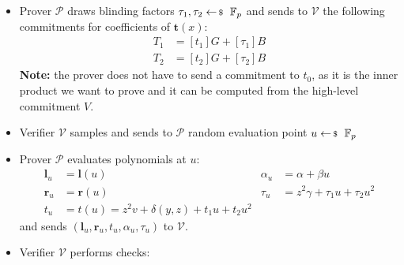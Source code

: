 \documentclass[../../book.tex]{subfiles}
\begin{document}
\begin{definition}
\begin{itemize}
\begin{equation*}
\begin{aligned}
                    t_0 &= \langle \mathbf{a}_L - z \cdot \mathbf{1}^n, z^2 \cdot \mathbf{2}^n + z \cdot \mathbf{y}^n + \mathbf{a}_R \circ \mathbf{y}^n\rangle = z^2v + \delta(y,z)\\
                    t_1 &= \langle \mathbf{a}_L - z \cdot \mathbf{1}^n, \mathbf{y}^n \circ \mathbf{s}_R \rangle + \langle \mathbf{y}^n \circ (\mathbf{a}_R + z\cdot \mathbf{1}^n ) + z^2 \cdot \mathbf{2}^n, \mathbf{s}_L\rangle \\
                    t_2 & = \langle \mathbf{s}_L, \mathbf{y}^n \circ \mathbf{s}_R \rangle
                \end{aligned}
            \end{equation*}
        \item Prover $\mathcal{P}$ draws blinding factors $\tau_1, \tau_2 \leftarrowS \mathbb{F}_p$ and sends to $\mathcal{V}$ the following commitments for coefficients of $\mathbf{t}(x)$:
            \begin{equation}
                \begin{aligned}
                    T_1 &= [t_1]G + [\tau_1]B \\
                    T_2 &= [t_2]G + [\tau_2]B
                \end{aligned}
            \end{equation}
            \textbf{Note:} the prover does not have to send a commitment to $t_0$, as it is the inner product we want to prove and it can be computed from the high-level commitment $V$.
        \item Verifier $\mathcal{V}$ samples and sends to $\mathcal{P}$ random evaluation point $u \leftarrowS \mathbb{F}_p$
        \item Prover $\mathcal{P}$ evaluates polynomials at $u$:
            \begin{equation}
                \begin{aligned}
                    \mathbf{l}_u & = \mathbf{l}(u) & \alpha_u &= \alpha + \beta u\\
                    \mathbf{r}_u &= \mathbf{r}(u) & \tau_u &= z^2\gamma + \tau_1 u + \tau_2 u^2\\
                    t_u &= t(u) = z^2v + \delta(y,z) + t_1u + t_2u^2 & 
                \end{aligned}
            \end{equation}
            and sends $(\mathbf{l}_u, \mathbf{r}_u, t_u, \alpha_u, \tau_u)$ to $\mathcal{V}$.
        \item Verifier $\mathcal{V}$ performs checks: 

\end{itemize}
\end{definition}
\end{document}
